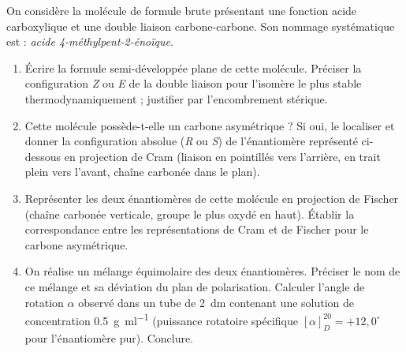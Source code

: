\documentclass[11pt]{article}
\begin{document}
\begin{exercice}
On considère la molécule de formule brute  présentant une fonction acide carboxylique et une double liaison carbone-carbone. Son nommage systématique est : \textit{acide 4-méthylpent-2-énoïque}.
\begin{enumerate}
    \item Écrire la formule semi-développée plane de cette molécule. Préciser la configuration \textit{Z} ou \textit{E} de la double liaison pour l'isomère le plus stable thermodynamiquement ; justifier par l'encombrement stérique.
    \item Cette molécule possède-t-elle un carbone asymétrique ? Si oui, le localiser et donner la configuration absolue (\textit{R} ou \textit{S}) de l'énantiomère représenté ci-dessous en projection de Cram (liaison  en pointillés vers l'arrière,  en trait plein vers l'avant, chaîne carbonée dans le plan).
    \begin{center}
    \end{center}
    \item Représenter les deux énantiomères de cette molécule en projection de Fischer (chaîne carbonée verticale, groupe le plus oxydé en haut). Établir la correspondance entre les représentations de Cram et de Fischer pour le carbone asymétrique.
    \item On réalise un mélange équimolaire des deux énantiomères. Préciser le nom de ce mélange et sa déviation du plan de polarisation. Calculer l'angle de rotation $\alpha$ observé dans un tube de \SI{2}{\deci\metre} contenant une solution de concentration \SI{0.5}{\gram\per\milli\litre} (puissance rotatoire spécifique $[\alpha]_D^{20} = +12,0^\circ$ pour l'énantiomère pur). Conclure.
\end{enumerate}
\end{exercice}
\end{document}
